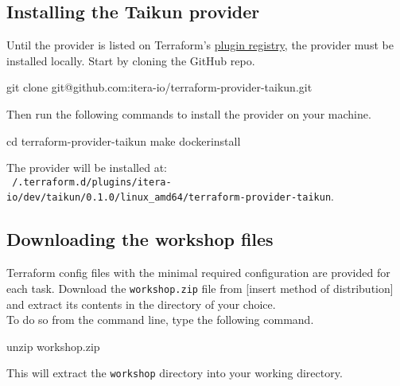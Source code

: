 \subsection{Installing the Taikun provider}
Until the provider is listed on Terraform's \href{https://registry.terraform.io/browse/providers}{plugin registry}, the provider must be installed locally.
Start by cloning the GitHub repo.
\begin{shell}
git clone git@github.com:itera-io/terraform-provider-taikun.git
\end{shell}
Then run the following commands to install the provider on your machine.
\begin{shell}
cd terraform-provider-taikun
make dockerinstall
\end{shell}
The provider will be installed at:\\
\texttt{~/.terraform.d/plugins/itera-io/dev/taikun/0.1.0/linux\_amd64/terraform-provider-taikun}.

\subsection{Downloading the workshop files}
Terraform config files with the minimal required configuration are provided for each task.
Download the \texttt{workshop.zip} file from [insert method of distribution] %
and extract its contents in the directory of your choice.\\

To do so from the command line, type the following command.
\begin{shell}
unzip workshop.zip
\end{shell}
This will extract the \texttt{workshop} directory into your working directory.
